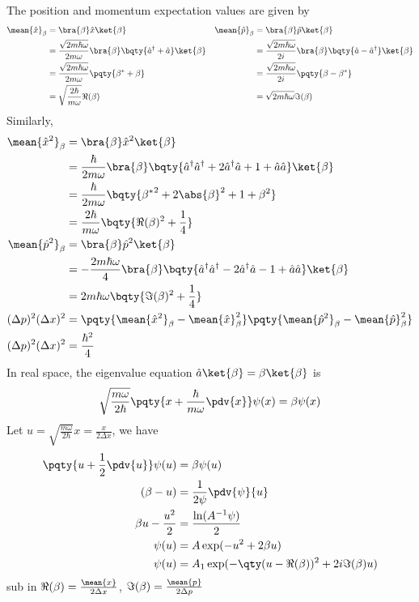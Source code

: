 \documentclass[12pt]{article}
\begin{document}
        The position and momentum expectation values are given by \begin{align*}
            \mean{\hat{x}}_{\beta} &=  \bra{\beta} \hat{x} \ket{\beta} & \mean{\hat{p}}_{\beta} &=  \bra{\beta} \hat{p} \ket{\beta}\\ 
            &= \frac{\sqrt{2m\hbar\omega }}{2m\omega}\bra{\beta} \bqty{\hat{a}^\dagger + \hat{a}} \ket{\beta}  & &= \frac{\sqrt{2m\hbar\omega }}{2i}\bra{\beta} \bqty{\hat{a} - \hat{a}^\dagger }\ket{\beta} \\
            &= \frac{\sqrt{2m\hbar\omega }}{2m\omega} \pqty{\beta^* + \beta} & &= \frac{\sqrt{2m\hbar\omega }}{2i} \pqty{\beta - \beta^*}  \\
            &= \sqrt{\frac{2\hbar}{m\omega}} \Re(\beta)& &= \sqrt{2m\hbar\omega } \Im(\beta)
        \end{align*}
        Similarly, \begin{align*}
            \mean{\hat{x}^2}_{\beta} &=  \bra{\beta} \hat{x}^2 \ket{\beta} \\
            &= {\frac{\hbar}{2m\omega}}\bra{\beta} \bqty{\hat{a}^\dagger \hat{a}^\dagger  + 2\hat{a}^\dagger \hat{a} + 1+ \hat{a}\hat{a}} \ket{\beta} \\
            &= {\frac{\hbar}{2m\omega}} \bqty{{\beta^*}^2  + 2\abs{\beta}^2 + 1+ \beta^2}  \\
            &= {\frac{2\hbar}{m\omega}} \bqty{\Re(\beta)^2 + \frac{1}{4}}  \\
            \mean{\hat{p}^2}_\beta &= \bra{\beta} \hat{p}^2 \ket{\beta} \\
            &= -\frac{2m\hbar\omega }{4} \bra{\beta}\bqty{\hat{a}^\dagger \hat{a}^\dagger  - 2\hat{a}^\dagger \hat{a} - 1 + \hat{a}\hat{a}} \ket{\beta} \\
            &= {2m\hbar\omega }\bqty{\Im(\beta)^2 + \frac{1}{4}}\\
            (\Delta p)^2 (\Delta x)^2 &= \pqty{\mean{\hat{x}^2}_\beta - \mean{\hat{x}}_\beta^2}\pqty{\mean{\hat{p}^2}_\beta - \mean{\hat{p}}_\beta^2}\\
            (\Delta p)^2 (\Delta x)^2 &= \frac{\hbar^2}{4}
        \end{align*}
        In real space, the eigenvalue equation \(\hat{a}\ket{\beta} = \beta \ket{\beta} \) is \begin{align*}
            \sqrt{\frac{m\omega}{2\hbar}} \pqty{x + \frac{\hbar}{m\omega} \pdv{x}} \psi(x) = \beta \psi(x)
        \end{align*}
        Let \(u = \sqrt{\frac{m\omega}{2\hbar}} x = \frac{x}{2\Delta x}\), we have \begin{align*}
            \pqty{u + \frac{1}{2}\pdv{u}} \psi(u) &=  \beta \psi(u)\\
            (\beta - u) &= \frac{1}{2\psi} \pdv{\psi}{u}\\
            \beta u - \frac{u^2}{2} &= \frac{\ln(A^{-1}\psi)}{2}\\
            \psi(u) &= A\exp( - u^2 + 2\beta u)\\
            \psi(u) &= A_1\exp( - \qty(u - \Re(\beta))^2 + 2i\Im(\beta)u)
        \end{align*}sub in \(\Re(\beta) = \frac{\mean{x}}{2\Delta x}\), \( \Im(\beta) = \frac{\mean{p}}{2\Delta p}\)
\end{document}
